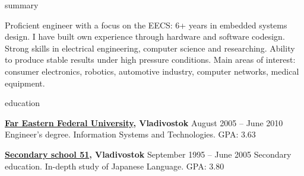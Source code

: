 \documentclass{template}
\begin{document}

\begin{rSection}{summary}

Proficient engineer with a focus on the EECS: 6+ years in embedded systems design. I have built own
experience through hardware and software codesign. Strong skills in electrical engineering,
computer science and researching. Ability to produce stable results under high pressure conditions.
Main areas of interest: consumer electronics, robotics, automotive industry, computer networks,
medical equipment.

\end{rSection}


\begin{rSection}{education}

{\bf \href{https://www.dvfu.ru/en/}{Far Eastern Federal University}, Vladivostok} \hfill {August 2005 -- June 2010} \newline
Engineer's degree. Information Systems and Technologies. \newline
GPA: 3.63

{\bf \href{http://www.school51.pupils.ru}{Secondary school 51}, Vladivostok} \hfill {September 1995 -- June 2005} \newline
Secondary education. In-depth study of Japanese Language. \newline
GPA: 3.80

\end{rSection}

\end{document}

